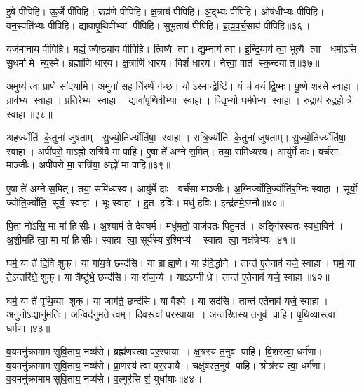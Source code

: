 इ॒षे पी॑पिहि। 
ऊ॒र्जे पी॑पिहि। 
ब्रह्म॑णे पीपिहि। 
क्ष॒त्राय॑ पीपिहि। 
अ॒द्भ्यः पी॑पिहि। 
ओष॑धीभ्यः पीपिहि। 
वन॒स्पति॑भ्यः पीपिहि। 
द्यावा॑पृ॒थिवीभ्यां पीपिहि। 
सु॒भू॒ताय॑ पीपिहि। 
ब्र॒ह्म॒व॒र्च॒साय॑ पीपिहि॥३६॥

यज॑मानाय पीपिहि। 
मह्यं॒ ज्यैष्ठ्या॑य पीपिहि। 
त्विष्यै त्वा। 
द्यु॒म्नाय॑ त्वा। 
इ॒न्द्रि॒याय॑ त्वा॒ भूत्यै त्वा। 
धर्मा॑ऽसि सु॒धर्मा मे न्य॒स्मे। 
ब्रह्मा॑णि धारय। 
क्ष॒त्राणि॑ धारय। 
विशं॑ धारय। 
नेत्त्वा॒ वात॑ स्क॒न्दयात्॥३७॥

अ॒मुष्य॑ त्वा प्रा॒णे सा॑दयामि। 
अ॒मुना॑ स॒ह नि॑र॒र्थं ग॑च्छ। 
योऽस्मान्द्वेष्टि॑। 
यं च॑ व॒यं द्वि॒ष्मः। 
पू॒ष्णे शर॑से॒ स्वाहा। 
ग्राव॑भ्य॒ स्वाहा। 
प्र॒ति॒रेभ्य॒ स्वाहा। 
द्यावा॑पृथि॒वीभ्या॒ स्वाहा। 
पि॒तृभ्यो॑ घर्म॒पेभ्य॒ स्वाहा। 
रु॒द्राय॑ रु॒द्रहोत्रे॒ स्वाहा॥३८॥

अह॒र्ज्योति॑ के॒तुना॑ जुषताम्। 
सु॒ज्यो॒तिर्ज्योति॑षा॒ स्वाहा। 
रात्रि॒र्ज्योति॑ के॒तुना॑ जुषताम्। 
सु॒ज्यो॒तिर्ज्योति॑षा॒ स्वाहा। 
अपी॑परो॒ माऽह्नो॒ रात्रि॑यै मा पाहि। 
ए॒षा ते॑ अग्ने स॒मित्। 
तया॒ समि॑ध्यस्व। 
आयु॑र्मे दाः। 
वर्च॑सा माञ्जीः। 
अपी॑परो मा॒ रात्रि॑या॒ अह्नो॑ मा पाहि॥३९॥

ए॒षा ते॑ अग्ने स॒मित्। 
तया॒ समि॑ध्यस्व। 
आयु॑र्मे दाः। 
वर्च॑सा माञ्जीः। 
अ॒ग्निर्ज्योति॒र्ज्योति॑र॒ग्निः स्वाहा। 
सूर्यो॒ ज्योति॒र्ज्योति॒ सूर्य॒ स्वाहा। 
भूः स्वाहा। 
हु॒त ह॒विः। 
मधु॑ ह॒विः। 
इन्द्र॑तमे॒ऽग्नौ॥४०॥

पि॒ता नो॑ऽसि॒ मा मा॑ हिसीः। 
अ॒श्याम॑ ते देवघर्म। 
मधु॑मतो॒ वाज॑वतः पितु॒मत॑। 
अङ्गि॑रस्वतः स्वधा॒विन॑। 
अ॒शी॒महि॑ त्वा॒ मा मा॑ हिसीः। 
स्वाहा त्वा॒ सूर्य॑स्य र॒श्मिभ्य॑। 
स्वाहा त्वा॒ नक्ष॑त्रेभ्यः॥४१॥
\anuvakamend[ब्र॒ह्म॒व॒र्च॒साय॑ पीपिहि स्क॒न्दयाद्रु॒द्राय॑ रु॒द्रहोत्रे॒ स्वाहाऽह्नो॑ मा पाह्य॒ग्नौ स॒प्त च॑]

घर्म॒ या ते॑ दि॒वि शुक्। 
या गा॑य॒त्रे छन्द॑सि। 
या ब्राह्म॒णे। 
या ह॑वि॒र्द्धाने। 
तान्त॑ ए॒तेनाव॑ यजे॒ स्वाहा। 
घर्म॒ या ते॒ऽन्तरि॑क्षे॒ शुक्। 
या त्रैष्टु॑भे॒ छन्द॑सि। 
या रा॑ज॒न्ये। 
याऽऽग्नीध्रे। 
तान्त॑ ए॒तेनाव॑ यजे॒ स्वाहा॥४२॥

घर्म॒ या ते॑ पृथि॒व्या शुक्। 
या जाग॑ते॒ छन्द॑सि। 
या वैश्ये। 
या सद॑सि। 
तान्त॑ ए॒तेनाव॑ यजे॒ स्वाहा। 
अनु॑नो॒ऽद्यानु॑मतिः। 
अन्विद॑नुमते॒ त्वम्। 
दि॒वस्त्वा॑ पर॒स्पाया। 
अ॒न्तरि॑क्षस्य त॒नुव॑ पाहि। 
पृ॒थि॒व्यास्त्वा॒ धर्म॑णा॥४३॥

व॒यमनु॑क्रामाम सुवि॒ताय॒ नव्य॑से। 
ब्रह्म॑णस्त्वा पर॒स्पाया। 
क्ष॒त्रस्य॑ त॒नुव॑ पाहि। 
वि॒शस्त्वा॒ धर्म॑णा। 
व॒यमनु॑क्रामाम सुवि॒ताय॒ नव्य॑से। 
प्रा॒णस्य॑ त्वा पर॒स्पायै। 
चक्षु॑षस्त॒नुव॑ पाहि। 
श्रोत्र॑स्य त्वा॒ धर्म॑णा। 
व॒यमनु॑क्रामाम सुवि॒ताय॒ नव्य॑से। 
व॒ल्गुर॑सि शं॒ युधा॑याः॥४४॥

